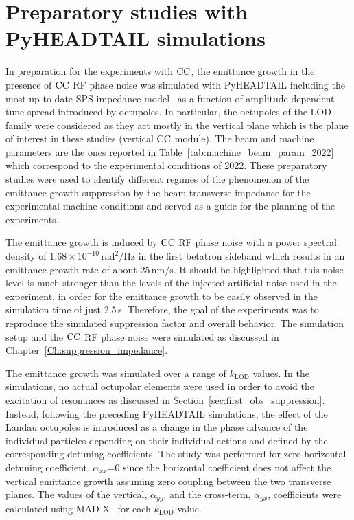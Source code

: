 \section{Preparatory studies with PyHEADTAIL simulations}\label{sec:preparatory_studies_2022_cc}

In preparation for the experiments with ${\mathrm{CC}}$, the emittance growth in the presence of ${\mathrm{CC}}$ RF phase noise was simulated with PyHEADTAIL including the most up-to-date SPS impedance model~\cite{updated_sps_wakfields_model} as a function of amplitude-dependent tune spread introduced by octupoles. In particular, the octupoles of the LOD family were considered as they act mostly in the vertical plane which is the plane of interest in these studies (vertical ${\mathrm{CC}}$ module). The beam and machine parameters are the ones reported in Table~\ref{tab:machine_beam_param_2022} which correspond to the experimental conditions of 2022. These preparatory studies were used to identify different regimes of the phenomenon of the emittance growth suppression by the beam transverse impedance for the experimental machine conditions and served as a guide for the planning of the experiments.

The emittance growth is induced by ${\mathrm{CC}}$ RF phase noise with a power spectral density of $1.68\times 10^{-10}$\,$\mathrm{rad^2/Hz}$ in the first betatron sideband which results in an emittance growth rate of about 25\,nm/s. It should be highlighted that this noise level is much stronger than the levels of the injected artificial noise used in the experiment, in order for the emittance growth to be easily observed in the simulation time of just 2.5\,s. Therefore, the goal of the experiments was to reproduce the simulated suppression factor and overall behavior. The simulation setup and the ${\mathrm{CC}}$ RF phase noise were simulated as discussed in Chapter~\ref{Ch:suppression_impedance}. 

The emittance growth was simulated over a range of $k_\mathrm{LOD}$ values. In the simulations, no actual octupolar elements were used in order to avoid the excitation of resonances as discussed in Section~\ref{sec:first_obs_suppression}. Instead, following the preceding PyHEADTAIL simulations, the effect of the Landau octupoles is introduced as a change in the phase advance of the individual particles depending on their individual actions and defined by the corresponding detuning coefficients. The study was performed for zero horizontal detuning coefficient, $\alpha_{xx}$=0 since the horizontal coefficient does not affect the vertical emittance growth assuming zero coupling between the two transverse planes. The values of the vertical, $\alpha_{yy}$, and the cross-term, $\alpha_{yx}$, coefficients were calculated using MAD-X~\cite{madx} for each $k_\mathrm{LOD}$ value.

